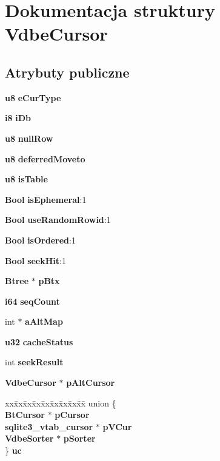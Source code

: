 \section{Dokumentacja struktury Vdbe\+Cursor}
\label{struct_vdbe_cursor}
\subsection*{Atrybuty publiczne}
\begin{DoxyCompactItemize}
\item 
\textbf{ u8} \textbf{ e\+Cur\+Type}
\item 
\textbf{ i8} \textbf{ i\+Db}
\item 
\textbf{ u8} \textbf{ null\+Row}
\item 
\textbf{ u8} \textbf{ deferred\+Moveto}
\item 
\textbf{ u8} \textbf{ is\+Table}
\item 
\textbf{ Bool} \textbf{ is\+Ephemeral}\+:1
\item 
\textbf{ Bool} \textbf{ use\+Random\+Rowid}\+:1
\item 
\textbf{ Bool} \textbf{ is\+Ordered}\+:1
\item 
\textbf{ Bool} \textbf{ seek\+Hit}\+:1
\item 
\textbf{ Btree} $\ast$ \textbf{ p\+Btx}
\item 
\textbf{ i64} \textbf{ seq\+Count}
\item 
int $\ast$ \textbf{ a\+Alt\+Map}
\item 
\textbf{ u32} \textbf{ cache\+Status}
\item 
int \textbf{ seek\+Result}
\item 
\textbf{ Vdbe\+Cursor} $\ast$ \textbf{ p\+Alt\+Cursor}
\item 
\begin{tabbing}
xx\=xx\=xx\=xx\=xx\=xx\=xx\=xx\=xx\=\kill
union \{\\
\>\textbf{ BtCursor} $\ast$ \textbf{ pCursor}\\
\>\textbf{ sqlite3\_vtab\_cursor} $\ast$ \textbf{ pVCur}\\
\>\textbf{ VdbeSorter} $\ast$ \textbf{ pSorter}\\
\} \textbf{ uc}\\


\end{tabbing}
\end{DoxyCompactItemize}
